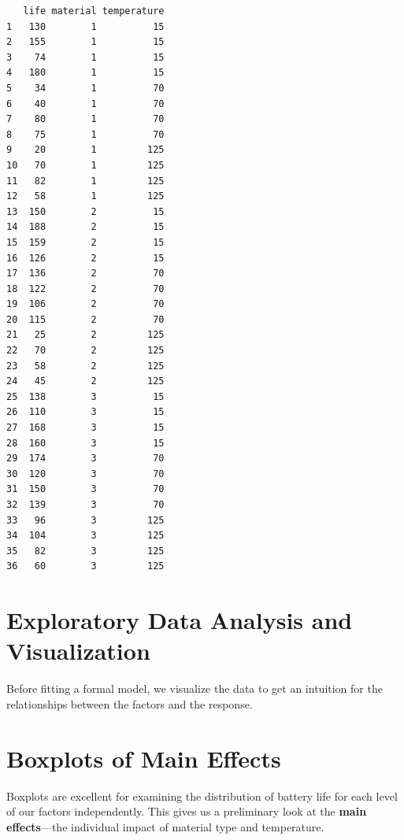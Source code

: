 \documentclass[
  letterpaper,
]{scrbook}
\begin{document}
\begin{verbatim}
   life material temperature
1   130        1          15
2   155        1          15
3    74        1          15
4   180        1          15
5    34        1          70
6    40        1          70
7    80        1          70
8    75        1          70
9    20        1         125
10   70        1         125
11   82        1         125
12   58        1         125
13  150        2          15
14  188        2          15
15  159        2          15
16  126        2          15
17  136        2          70
18  122        2          70
19  106        2          70
20  115        2          70
21   25        2         125
22   70        2         125
23   58        2         125
24   45        2         125
25  138        3          15
26  110        3          15
27  168        3          15
28  160        3          15
29  174        3          70
30  120        3          70
31  150        3          70
32  139        3          70
33   96        3         125
34  104        3         125
35   82        3         125
36   60        3         125
\end{verbatim}

\section{Exploratory Data Analysis and
Visualization}\label{exploratory-data-analysis-and-visualization}

Before fitting a formal model, we visualize the data to get an intuition
for the relationships between the factors and the response.

\section{Boxplots of Main Effects}\label{boxplots-of-main-effects}

Boxplots are excellent for examining the distribution of battery life
for each level of our factors independently. This gives us a preliminary
look at the \textbf{main effects}---the individual impact of material
type and temperature.
\end{document}
